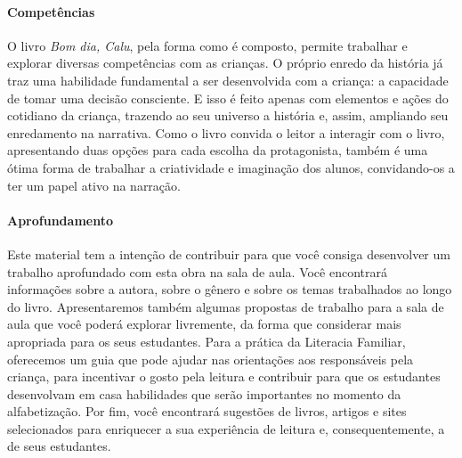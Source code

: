 \documentclass[11pt]{extarticle}
\begin{document}
\paragraph{Competências}
O livro \textit{Bom dia, Calu}, pela forma como é composto, permite trabalhar e explorar diversas competências com as crianças. O próprio enredo da história já traz uma habilidade fundamental a ser desenvolvida com a criança: a capacidade de tomar uma decisão consciente. E isso é feito apenas com elementos e ações do cotidiano da criança, trazendo ao seu universo a história e, assim, ampliando seu enredamento na narrativa. Como o livro convida o leitor a interagir com o livro, apresentando duas opções para cada escolha da protagonista, também é uma ótima forma de trabalhar a criatividade e imaginação dos alunos, convidando-os a ter um papel ativo na narração.


\paragraph{Aprofundamento} Este material tem a 
intenção de contribuir para que você consiga desenvolver um trabalho aprofundado 
com esta obra na sala de aula. Você encontrará informações sobre a autora, sobre 
o gênero e sobre os temas trabalhados ao longo do livro. Apresentaremos também 
algumas propostas de trabalho para a sala de aula que você poderá explorar livremente, 
da forma que considerar mais apropriada para os seus estudantes. Para a prática 
da Literacia Familiar, oferecemos um guia que pode ajudar nas orientações aos 
responsáveis pela criança, para incentivar o gosto pela leitura e contribuir para 
que os estudantes desenvolvam em casa habilidades que serão importantes no momento 
da alfabetização. Por fim, você encontrará sugestões de livros, artigos e sites 
selecionados para enriquecer a sua experiência de leitura e, 
consequentemente, a de seus estudantes.



\reversemarginpar
\marginparwidth=5cm
\end{document}
